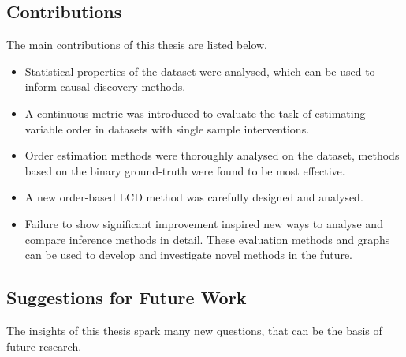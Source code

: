 \subsection{Contributions}
The main contributions of this thesis are listed below.

\begin{itemize}[noitemsep]
    \item Statistical properties of the \citet{kemmeren2014large} dataset were analysed, which can be used to inform causal discovery methods.
    \item A continuous metric was introduced to evaluate the task of estimating variable order in datasets with single sample interventions.
    \item Order estimation methods were thoroughly analysed on the \citet{kemmeren2014large} dataset, methods based on the binary ground-truth were found to be most effective.
    \item A new order-based LCD method was carefully designed and analysed. 
    \item Failure to show significant improvement inspired new ways to analyse and compare inference methods in detail. These evaluation methods and graphs can be used to develop and investigate novel methods in the future. 
\end{itemize}


\subsection{Suggestions for Future Work}

The insights of this thesis spark many new questions, that can be the basis of future research.

